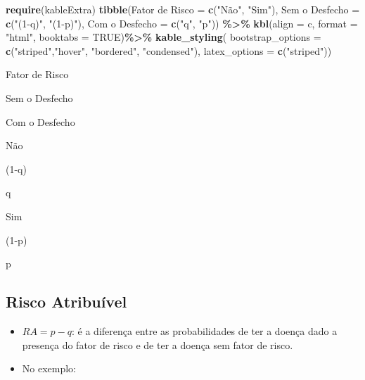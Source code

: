 \documentclass[
]{book}
\newenvironment{Shaded}{\begin{snugshade}}{\end{snugshade}}
\newcommand{\AttributeTok}[1]{\textcolor[rgb]{0.13,0.29,0.53}{#1}}
\newcommand{\ConstantTok}[1]{\textcolor[rgb]{0.56,0.35,0.01}{#1}}
\newcommand{\FunctionTok}[1]{\textcolor[rgb]{0.13,0.29,0.53}{\textbf{#1}}}
\newcommand{\NormalTok}[1]{#1}
\newcommand{\OtherTok}[1]{\textcolor[rgb]{0.56,0.35,0.01}{#1}}
\newcommand{\SpecialCharTok}[1]{\textcolor[rgb]{0.81,0.36,0.00}{\textbf{#1}}}
\newcommand{\StringTok}[1]{\textcolor[rgb]{0.31,0.60,0.02}{#1}}
\providecommand{\tightlist}{%
  \setlength{\itemsep}{0pt}\setlength{\parskip}{0pt}}
\begin{document}
\begin{Shaded}
\begin{Highlighting}[]
\FunctionTok{require}\NormalTok{(kableExtra)}
\FunctionTok{tibble}\NormalTok{(}\StringTok{\textquotesingle{}Fator de Risco\textquotesingle{}} \OtherTok{=} \FunctionTok{c}\NormalTok{(}\StringTok{"Não"}\NormalTok{, }\StringTok{"Sim"}\NormalTok{), }
       \StringTok{\textquotesingle{}Sem o Desfecho\textquotesingle{}} \OtherTok{=} \FunctionTok{c}\NormalTok{(}\StringTok{"(1{-}q)"}\NormalTok{, }\StringTok{"(1{-}p)"}\NormalTok{), }
       \StringTok{\textquotesingle{}Com o Desfecho\textquotesingle{}} \OtherTok{=} \FunctionTok{c}\NormalTok{(}\StringTok{"q"}\NormalTok{, }\StringTok{"p"}\NormalTok{)) }\SpecialCharTok{\%\textgreater{}\%} 
  \FunctionTok{kbl}\NormalTok{(}\AttributeTok{align =} \StringTok{\textquotesingle{}c\textquotesingle{}}\NormalTok{, }\AttributeTok{format =} \StringTok{"html"}\NormalTok{, }\AttributeTok{booktabs =} \ConstantTok{TRUE}\NormalTok{)}\SpecialCharTok{\%\textgreater{}\%} 
  \FunctionTok{kable\_styling}\NormalTok{(}
     \AttributeTok{bootstrap\_options =} \FunctionTok{c}\NormalTok{(}\StringTok{"striped"}\NormalTok{,}\StringTok{"hover"}\NormalTok{, }\StringTok{"bordered"}\NormalTok{, }\StringTok{"condensed"}\NormalTok{), }
     \AttributeTok{latex\_options =} \FunctionTok{c}\NormalTok{(}\StringTok{"striped"}\NormalTok{))}
\end{Highlighting}
\end{Shaded}

Fator de Risco

Sem o Desfecho

Com o Desfecho

Não

(1-q)

q

Sim

(1-p)

p

\subsection{Risco Atribuível}\label{risco-atribuuxedvel}

\begin{itemize}
\tightlist
\item
  \(RA = p - q\): é a diferença entre as probabilidades de ter a doença dado a presença do fator de risco e de ter a doença sem fator de risco.\\
\item
  No exemplo:
\end{itemize}
\end{document}
